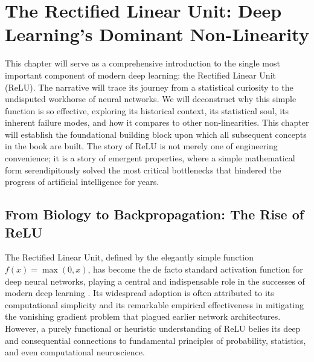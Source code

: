 \ifdefined\ispartofbook
\else
  
  
\fi

\chapter{The Rectified Linear Unit: Deep Learning's Dominant Non-Linearity}
\label{chap:relu}


This chapter will serve as a comprehensive introduction to the single most important component of modern deep learning: the Rectified Linear Unit (ReLU). The narrative will trace its journey from a statistical curiosity to the undisputed workhorse of neural networks. We will deconstruct why this simple function is so effective, exploring its historical context, its statistical soul, its inherent failure modes, and how it compares to other non-linearities. This chapter will establish the foundational building block upon which all subsequent concepts in the book are built. The story of ReLU is not merely one of engineering convenience; it is a story of emergent properties, where a simple mathematical form serendipitously solved the most critical bottlenecks that hindered the progress of artificial intelligence for years.

\section{From Biology to Backpropagation: The Rise of ReLU}
\label{sec:rise_of_relu}

The Rectified Linear Unit, defined by the elegantly simple function $f(x) = \max(0, x)$, has become the de facto standard activation function for deep neural networks, playing a central and indispensable role in the successes of modern deep learning \cite{DansbeckerRELUKaggle}. Its widespread adoption is often attributed to its computational simplicity and its remarkable empirical effectiveness in mitigating the vanishing gradient problem that plagued earlier network architectures. However, a purely functional or heuristic understanding of ReLU belies its deep and consequential connections to fundamental principles of probability, statistics, and even computational neuroscience.

